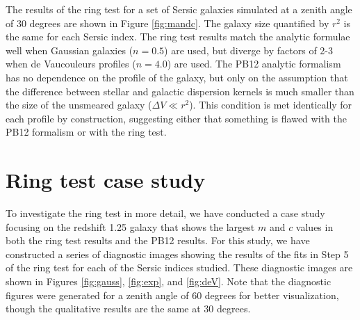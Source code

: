 \documentclass[apj]{emulateapj}
\begin{document}
The results of the ring test for a set of Sersic galaxies simulated at
a zenith angle of 30 degrees are shown in Figure \ref{fig:mandc}.  The
galaxy size quantified by $r^2$ is the same for each Sersic index.
The ring test results match the analytic formulae well when Gaussian
galaxies ($n=0.5$) are used, but diverge by factors of 2-3 when de
Vaucouleurs profiles ($n=4.0$) are used.  The PB12 analytic formalism
has no dependence on the profile of the galaxy, but only on the
assumption that the difference between stellar and galactic dispersion
kernels is much smaller than the size of the unsmeared galaxy ($\Delta
V \ll r^2$).  This condition is met identically for each profile by
construction, suggesting either that something is flawed with the PB12
formalism or with the ring test.

\begin{figure*}
\begin{center}
\end{center}
\caption[fig1]{\label{fig:mandc} The shear calibration parameters $m$
  and $c$ plotted against redshift.  The results are obtained from the
  ring test assuming a true PSF derived from an elliptical galaxy
  spectrum and reconstruction PSF derived from a G5v stellar spectrum.
  The true galaxy images are simulated using the values: $r_e = 1.1$,
  and $|e| = 0.2$.  Three values of the galaxy Sersic parameter $n$
  are shown: $n=0.5$, corresponding to a Gaussian profile (blue),
  $n=1.0$, corresponding to an exponential profile (green), and
  $n=4.0$, corresponding to a de Vaucouleurs profile (red).  Squares
  are used for $m_1$ and $c_1$, and ``x's'' for $m_2$ and $c_2$. The
  cyan line in each panel shows the analytic result from the PB12
  formalism.  The zenith angle is 30 degrees.}
\end{figure*}

\section{Ring test case study}\label{sec:casestudy}

To investigate the ring test in more detail, we have conducted a case
study focusing on the redshift 1.25 galaxy that shows the largest $m$
and $c$ values in both the ring test results and the PB12 results.
For this study, we have constructed a series of diagnostic images
showing the results of the fits in Step 5 of the ring test for each of
the Sersic indices studied.  These diagnostic images are shown in
Figures \ref{fig:gauss}, \ref{fig:exp}, and \ref{fig:deV}.  Note that
the diagnostic figures were generated for a zenith angle of 60 degrees
for better visualization, though the qualitative results are the same
at 30 degrees.
\end{document}
